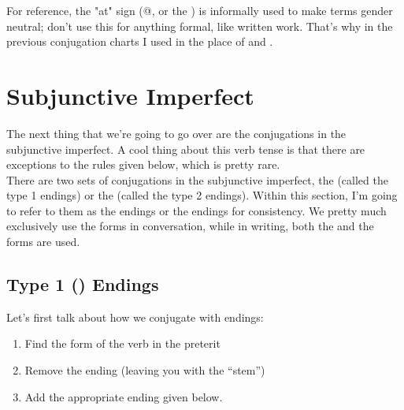 




For reference, the "at" sign (@, or the ) is informally used to make terms gender neutral; don't use this for anything formal, like written work. That's why in the previous conjugation charts I used  in the place of  and . 


\section{Subjunctive Imperfect}

The next thing that we're going to go over are the conjugations in the subjunctive imperfect. A cool thing about this verb tense is that there are  exceptions to the rules given below, which is pretty rare. \\

There are two sets of conjugations in the subjunctive imperfect, the  (called the type 1 endings) or the  (called the type 2 endings). Within this section, I'm going to refer to them as the  endings or the  endings for consistency. We pretty much exclusively use the  forms in conversation, while in writing, both the  and the  forms are used.\\

\subsection{Type 1 () Endings}
Let's first talk about how we conjugate with  endings: 
\begin{enumerate}[noitemsep]
	\item Find the  form of the verb in the preterit
	\item Remove the  ending (leaving you with the ``stem'')
	\item Add the appropriate ending given below. 
\end{enumerate}
\

